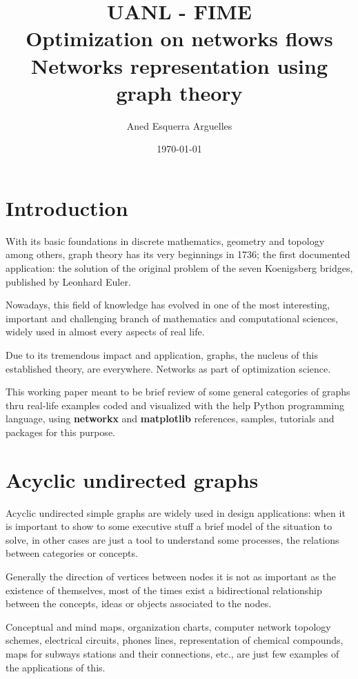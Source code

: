 \documentclass{article}
\title{
UANL - FIME\\ 
Optimization on networks flows\\
Networks representation using graph theory \\
}
\author{Aned Esquerra Arguelles}
\date{\today}
\begin{document}
\raggedright
\maketitle

\section*{Introduction}
With its basic foundations in discrete mathematics, geometry and topology among others,  graph theory  has its very beginnings in 1736; the first documented application: the solution of the original problem of  the seven Koenigsberg  bridges, published by Leonhard Euler.\linebreak

Nowadays, this field of knowledge has evolved in one of the most interesting, important and challenging branch of mathematics and computational sciences, widely used in almost every aspects of real life.\linebreak 

Due to its tremendous impact and application, graphs, the nucleus of this established theory, are everywhere. Networks as part of optimization science.\linebreak

This working paper meant to be brief review of some general categories of graphs thru real-life examples coded and visualized with the help Python programming language, using \textbf{networkx} \cite{networkx} and  \textbf{matplotlib}\cite{matplotlib} references, samples, tutorials and packages for this purpose. \cite{autor2014}

\section{Acyclic undirected graphs}

Acyclic undirected simple graphs are widely used in design applications: when it is important to show to some executive stuff a brief model of the situation to solve, in other cases are just a tool to understand some processes, the relations between categories or concepts.\linebreak

Generally the direction of vertices between nodes it is not as important as the existence of themselves, most of the times exist a bidirectional relationship between the concepts, ideas or objects associated to the nodes.\linebreak  

Conceptual and mind maps, organization charts, computer network topology schemes, electrical circuits, phones lines, representation of chemical compounds, maps for subways stations and their connections, etc., are just few examples of the applications of this. \linebreak
\end{document}
